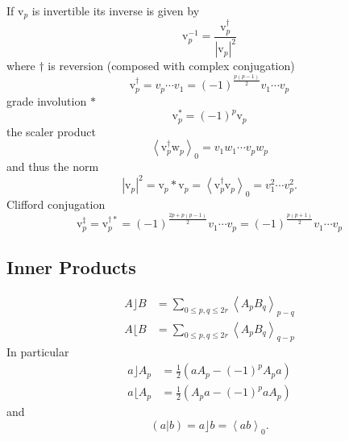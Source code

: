 \documentclass[aps,preprint]{revtex4}%
\begin{document}
If $\mathrm{v}_{p}$ is invertible its inverse is given by
\begin{equation}
\mathrm{v}_{p}^{-1}=\frac{\mathrm{v}_{p}^{\dagger}}{\left\vert \mathrm{v}%
_{p}\right\vert ^{2}}%
\end{equation}
where $\dagger$ is reversion (composed with complex conjugation)
\begin{equation}
\mathrm{v}_{p}^{\dagger}=v_{p}\cdots v_{1}=\left(  -1\right)  ^{\frac{p\left(
p-1\right)  }{2}}v_{1}\cdots v_{p}%
\end{equation}
grade involution $\ast$
\begin{equation}
\mathrm{v}_{p}^{\ast}=\left(  -1\right)  ^{p}\mathrm{v}_{p}%
\end{equation}
the scaler product%
\begin{equation}
\left\langle \mathrm{v}_{p}^{\dagger}\mathrm{w}_{p}\right\rangle _{0}%
=v_{1}w_{1}\cdots v_{p}w_{p}%
\end{equation}
and thus the norm
\begin{equation}
\left\vert \mathrm{v}_{p}\right\vert ^{2}=\mathrm{v}_{p}\ast\mathrm{v}%
_{p}=\left\langle \mathrm{v}_{p}^{\dagger}\mathrm{v}_{p}\right\rangle
_{0}=v_{1}^{2}\cdots v_{p}^{2}.
\end{equation}
Clifford conjugation
\begin{equation}
\mathrm{v}_{p}^{\ddagger}=\mathrm{v}_{p}^{\dagger\ast}=\left(  -1\right)
^{\frac{2p+p\left(  p-1\right)  }{2}}v_{1}\cdots v_{p}=\left(  -1\right)
^{\frac{p\left(  p+1\right)  }{2}}v_{1}\cdots v_{p}%
\end{equation}


\subsection{Inner Products}%

\begin{align}
A\rfloor B  &  =\sum_{0\leq p,q\leq2r}\left\langle A_{p}B_{q}\right\rangle
_{p-q}\\
A\lfloor B  &  =\sum_{0\leq p,q\leq2r}\left\langle A_{p}B_{q}\right\rangle
_{q-p}%
\end{align}
In particular
\begin{align}
a\rfloor A_{p}  &  =\frac{1}{2}\left(  aA_{p}-\left(  -1\right)  ^{p}%
A_{p}a\right) \\
a\lfloor A_{p}  &  =\frac{1}{2}\left(  A_{p}a-\left(  -1\right)  ^{p}%
aA_{p}\right)
\end{align}
and
\begin{equation}
\left(  \left.  a\right\vert b\right)  =a\rfloor b=\left\langle
ab\right\rangle _{0}.
\end{equation}
\end{document}

